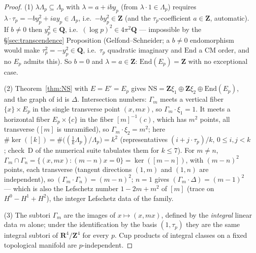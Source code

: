 \documentclass[11pt]{article}
\theoremstyle{definition}
\theoremstyle{remark}
\newcommand{\Z}{\mathbf{Z}}
\newcommand{\Q}{\mathbf{Q}}
\newcommand{\R}{\mathbf{R}}
\newcommand{\NS}{\mathrm{NS}}
\newcommand{\End}{\mathrm{End}}
\begin{document}
\begin{proof}
(1) $\lambda\Lambda_p \subseteq \Lambda_p$ with $\lambda = a + i b y_p$
(from $\lambda\cdot 1 \in \Lambda_p$) requires
$\lambda\cdot\tau_p = -b y_p^2 + i a y_p \in \Lambda_p$, i.e.\
$-b y_p^2 \in \Z$ (and the $\tau_p$-coefficient $a \in \Z$, automatic). If
$b \neq 0$ then $y_p^2 \in \Q$, i.e.\ $(\log p)^2 \in 4\pi^2\Q$ ---
impossible by the \S\ref{sec:transcendence} Proposition
(Gelfond--Schneider; a $b \neq 0$ endomorphism would make
$\tau_p^2 = -y_p^2 \in \Q$, i.e.\ $\tau_p$ quadratic imaginary and $\End$ a
CM order, and no $E_p$ admits this). So $b = 0$ and $\lambda = a \in \Z$:
$\End(E_p) = \Z$ with no exceptional case.

(2) Theorem~\ref{thm:NS} with $E = E' = E_p$ gives
$\NS = \Z\xi_1 \oplus \Z\xi_2 \oplus \End(E_p)$, and the graph of
$\mathrm{id}$ is $\Delta$. Intersection numbers: $\Gamma_m$ meets a vertical
fiber $\{x\}\times E_p$ in the single transverse point $(x, mx)$, so
$\Gamma_m\cdot\xi_1 = 1$. It meets a horizontal fiber $E_p\times\{c\}$ in
the fiber $[m]^{-1}(c)$, which has $m^2$ points, all transverse ($[m]$ is
unramified), so $\Gamma_m\cdot\xi_2 = m^2$; here
$\#\ker([k]) = \#\bigl((\tfrac{1}{k}\Lambda_p)/\Lambda_p\bigr) = k^2$
(representatives $(i + j\cdot\tau_p)/k$, $0 \leq i, j < k$; check~D of the
numerical suite tabulates them for $k \leq 7$). For $m \neq n$,
$\Gamma_m \cap \Gamma_n = \{(x, mx) : (m-n)x = 0\} = \ker([m-n])$, with
$(m-n)^2$ points, each transverse (tangent directions $(1, m)$ and $(1, n)$
are independent), so $(\Gamma_m\cdot\Gamma_n) = (m-n)^2$; $n = 1$ gives
$(\Gamma_m\cdot\Delta) = (m-1)^2$ --- which is also the Lefschetz number
$1 - 2m + m^2$ of $[m]$ (trace on $H^0 - H^1 + H^2$), the integer Lefschetz
data of the family.

(3) The subtori $\Gamma_m$ are the images of $x \mapsto (x, mx)$, defined by
the \emph{integral} linear data $m$ alone; under the identification by the
basis $(1, \tau_p)$ they are the same integral subtori of $\R^4/\Z^4$ for
every $p$. Cup products of integral classes on a fixed topological manifold
are $p$-independent.
\end{proof}
\end{document}
